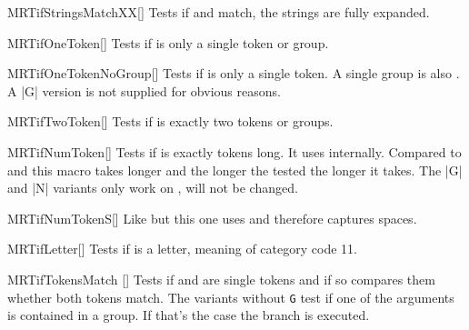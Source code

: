 \begin{describemacroTF}[G]{MRTifStringsMatchXX}[]
  Tests if  and  match, the strings are fully
  expanded.
\end{describemacroTF}

\begin{describemacroTF}[G,N,GN]{MRTifOneToken}[]
  Tests if  is only a single token or group.
\end{describemacroTF}

\begin{describemacroTF}[N]{MRTifOneTokenNoGroup}[]
  Tests if  is only a single token. A single group is also
  . A |G| version is not supplied for obvious reasons.
\end{describemacroTF}

\begin{describemacroTF}[G,N,GN]{MRTifTwoToken}[]
  Tests if  is exactly two tokens or groups.
\end{describemacroTF}

\begin{describemacroTF}[G,N,GN]{MRTifNumToken}[]
  Tests if  is exactly  tokens long. It uses
   internally. Compared to  and
   this macro takes longer and the longer the tested
   the longer it takes. The |G| and |N| variants only work on
  ,  will not be changed.
\end{describemacroTF}

\begin{describemacroTF}[G,N,GN]{MRTifNumTokenS}[]
  Like  but this one uses  and therefore
  captures spaces.
\end{describemacroTF}

\begin{describemacroTF}[G,N,GN]{MRTifLetter}[]
  Tests if  is a letter, meaning of category code 11.
\end{describemacroTF}

\begin{describemacroTF}{MRTifTokensMatch}%
  []
  Tests if  and  are single tokens and if so compares
  them whether both tokens match. The variants without \texttt{G} test if one of
  the arguments is contained in a group. If that's the case the 
  branch is executed.
\end{describemacroTF}


